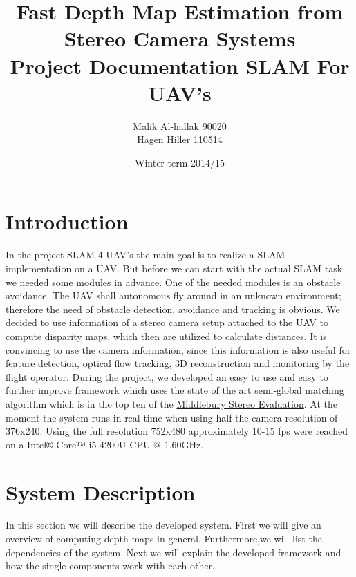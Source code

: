 \documentclass[11pt]{article}
\title{\textbf{Fast Depth Map Estimation from Stereo Camera Systems}\\Project Documentation SLAM For UAV's}
\author{Malik Al-hallak 90020\\
		Hagen Hiller 110514 }
\date{Winter term 2014/15}
\begin{document}
\maketitle



\section{Introduction}
In the project SLAM 4 UAV's the main goal is to realize a SLAM implementation on a UAV. But before we can start with the actual SLAM task we needed some modules in advance. One of the needed modules is an obstacle avoidance. The UAV shall autonomous fly around in an unknown environment; therefore the need of obstacle detection, avoidance and tracking is obvious. We decided to use information of a stereo camera setup attached to the UAV to compute disparity maps, which then are utilized to calculate distances. It is convincing to use the camera information, since this information is also useful for feature detection, optical flow tracking, 3D reconstruction and monitoring by the flight operator. During the project, we developed an easy to use and easy to further improve framework which uses the state of the art semi-global matching algorithm which is in the top ten of the \href{http://vision.middlebury.edu/stereo/eval3/}{Middlebury Stereo Evaluation}. At the moment the system runs in real time when using half the camera resolution of 376x240. Using the full resolution 752x480 approximately 10-15 fps were reached on a Intel® Core™ i5-4200U CPU @ 1.60GHz.
\section{System Description}
In this section we will describe the developed system. First we will give an overview of computing depth maps in general. Furthermore,we will list the dependencies of the system. Next we will explain the developed framework and how the single components work with each other.
\end{document}
